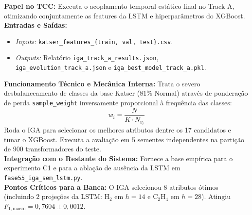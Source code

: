 \documentclass[10pt,a4paper]{article}
\begin{document}
\begin{filebox}
\textbf{Papel no TCC:} Executa o acoplamento temporal-estático final no Track A, otimizando conjuntamente as features da LSTM e hiperparâmetros do XGBoost.\\
\textbf{Entradas e Saídas:}
\begin{itemize}[leftmargin=*,itemsep=1pt]
  \item \textit{Inputs:} \texttt{katser\_features\_\{train, val, test\}.csv}.
  \item \textit{Outputs:} Relatório \texttt{iga\_track\_a\_results.json}, \texttt{iga\_evolution\_track\_a.json} e \texttt{iga\_best\_model\_track\_a.pkl}.
\end{itemize}
\textbf{Funcionamento Técnico e Mecânica Interna:} Trata o severo desbalanceamento de classes da base Katser (81\% Normal) através de ponderação de perda \texttt{sample\_weight} inversamente proporcional à frequência das classes:
$$w_i = \frac{N}{K \cdot N_{y_i}}$$
Roda o IGA para selecionar os melhores atributos dentre os 17 candidatos e tunar o XGBoost. Executa a avaliação em 5 sementes independentes na partição de 900 transformadores do teste.\\
\textbf{Integração com o Restante do Sistema:} Fornece a base empírica para o experimento C1 e para a ablação de ausência da LSTM em \texttt{fase55\_iga\_sem\_lstm.py}.\\
\textbf{Pontos Críticos para a Banca:} O IGA selecionou 8 atributos ótimos (incluindo 2 projeções da LSTM: $\text{H}_2$ em $h=14$ e $\text{C}_2\text{H}_4$ em $h=28$). Atingiu $F_{1,\text{macro}} = 0,7604 \pm 0,0012$.
\end{filebox}
\end{document}
